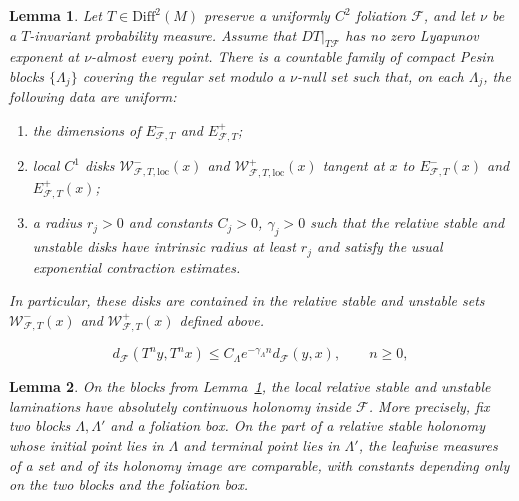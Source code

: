 \documentclass[10pt,a4paper]{amsart}
\newtheorem{lem}{Lemma}
\newcommand{\Diff}{\mathrm{Diff}}
\begin{document}
\begin{lem}
\label{lem:app-relative-pesin}
Let $T\in\Diff^2(M)$ preserve a uniformly $C^2$ foliation $\mathcal F$,
and let $\nu$ be a $T$-invariant probability measure.  Assume that
$DT|_{T\mathcal F}$ has no zero Lyapunov exponent at $\nu$-almost every
point.  There is a countable family of compact Pesin blocks
$\{\Lambda_j\}$ covering the regular set modulo a $\nu$-null set such that, on
each $\Lambda_j$, the following data are uniform:
\begin{enumerate}
\item the dimensions of $E^-_{\mathcal F,T}$ and $E^+_{\mathcal F,T}$;
\item local $C^1$ disks
$\mathcal W^-_{\mathcal F,T,\mathrm{loc}}(x)$ and
$\mathcal W^+_{\mathcal F,T,\mathrm{loc}}(x)$ tangent at $x$ to
$E^-_{\mathcal F,T}(x)$ and $E^+_{\mathcal F,T}(x)$;
\item a radius $r_j>0$ and constants $C_j>0$, $\gamma_j>0$ such that the
relative stable and unstable disks have intrinsic radius at least $r_j$ and
satisfy the usual exponential contraction estimates.
\end{enumerate}
In particular, these disks are contained in the relative stable and unstable
sets $\mathcal W^-_{\mathcal F,T}(x)$ and
$\mathcal W^+_{\mathcal F,T}(x)$ defined above.
\end{lem}

\begin{equation}\label{eq:leafwise-stable-contraction}
 d_{\mathcal F}(T^ny,T^nx)
 \le C_\Lambda e^{-\gamma_\Lambda n}d_{\mathcal F}(y,x),
 \qquad n\ge0,
\end{equation}

\begin{lem}
\label{lem:app-relative-ac}
On the blocks from Lemma~\ref{lem:app-relative-pesin}, the local relative
stable and unstable laminations have absolutely continuous holonomy inside
$\mathcal F$.  More precisely, fix two blocks $\Lambda,\Lambda'$ and a
foliation box.  On the part of a relative stable holonomy whose initial
point lies in $\Lambda$ and terminal point lies in $\Lambda'$, the
leafwise measures of a set and of its holonomy image are comparable, with
constants depending only on the two blocks and the foliation box.
\end{lem}
\end{document}
